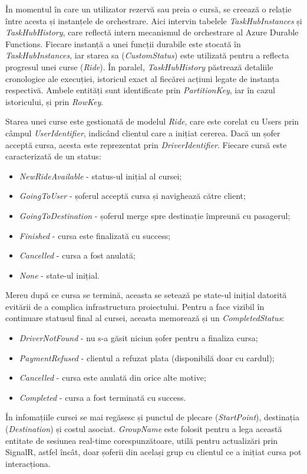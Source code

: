 În momentul în care un utilizator rezervă sau preia o cursă, se creează o relație între acesta și instanțele de orchestrare.
Aici intervin tabelele \textit{TaskHubInstances} și \textit{TaskHubHistory}, care reflectă intern mecanismul
de orchestrare al Azure Durable Functions. Fiecare instanță a unei funcții durabile este stocată în \textit{TaskHubInstances}, iar starea
sa (\textit{CustomStatus}) este utilizată pentru a reflecta progresul unei curse (\textit{Ride}). În paralel, \textit{TaskHubHistory} păstrează detaliile cronologice ale
execuției, istoricul exact al fiecărei acțiuni legate de instanța respectivă. Ambele entități sunt identificate prin \textit{PartitionKey}, iar
în cazul istoricului, și prin \textit{RowKey}.

Starea unei curse este gestionată de modelul \textit{Ride}, care este corelat cu Users prin câmpul \textit{UserIdentifier}, indicând clientul
care a inițiat cererea. Dacă un șofer acceptă cursa, acesta este reprezentat prin \textit{DriverIdentifier}. Fiecare cursă este
caracterizată de un status:
\begin{itemize}
    \item \textit{NewRideAvailable} - status-ul inițial al cursei;
    \item \textit{GoingToUser} - șoferul acceptă cursa și navighează către client;
    \item \textit{GoingToDestination} - șoferul merge spre destinație împreună cu pasagerul;
    \item \textit{Finished} - cursa este finalizată cu success;
    \item \textit{Cancelled} - cursa a fost anulată;
    \item \textit{None} - state-ul inițial.
\end{itemize}
Mereu după ce cursa se termină, aceasta se setează pe state-ul inițial datorită evitării de a complica infrastructura proiectului.
Pentru a face vizibil în continuare statusul final al cursei, aceasta memorează și un \textit{CompletedStatus}:
\begin{itemize}
    \item \textit{DriverNotFound} - nu s-a găsit niciun șofer pentru a finaliza cursa;
    \item \textit{PaymentRefused} - clientul a refuzat plata (disponibilă doar cu cardul);
    \item \textit{Cancelled} - cursa este anulată din orice alte motive;
    \item \textit{Completed} - cursa a fost terminată cu success.
\end{itemize}
În infomațiile cursei se mai regăsesc și punctul de plecare (\textit{StartPoint}),
destinația (\textit{Destination}) și costul asociat. \textit{GroupName} este folosit pentru a lega această entitate de sesiunea real-time
corespunzătoare, utilă pentru actualizări prin SignalR, astfel încât, doar șoferii din același grup cu clientul ce a inițiat cursa pot interacționa.


